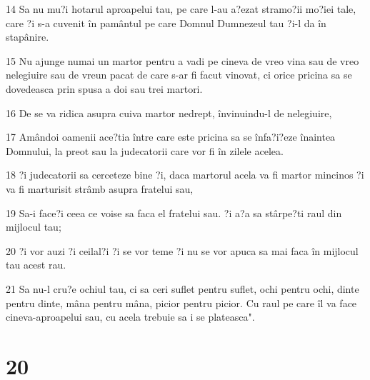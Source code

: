 \par 14 Sa nu mu?i hotarul aproapelui tau, pe care l-au a?ezat stramo?ii mo?iei tale, care ?i s-a cuvenit în pamântul pe care Domnul Dumnezeul tau ?i-l da în stapânire.
\par 15 Nu ajunge numai un martor pentru a vadi pe cineva de vreo vina sau de vreo nelegiuire sau de vreun pacat de care s-ar fi facut vinovat, ci orice pricina sa se dovedeasca prin spusa a doi sau trei martori.
\par 16 De se va ridica asupra cuiva martor nedrept, învinuindu-l de nelegiuire,
\par 17 Amândoi oamenii ace?tia între care este pricina sa se înfa?i?eze înaintea Domnului, la preot sau la judecatorii care vor fi în zilele acelea.
\par 18 ?i judecatorii sa cerceteze bine ?i, daca martorul acela va fi martor mincinos ?i va fi marturisit strâmb asupra fratelui sau,
\par 19 Sa-i face?i ceea ce voise sa faca el fratelui sau. ?i a?a sa stârpe?ti raul din mijlocul tau;
\par 20 ?i vor auzi ?i ceilal?i ?i se vor teme ?i nu se vor apuca sa mai faca în mijlocul tau acest rau.
\par 21 Sa nu-l cru?e ochiul tau, ci sa ceri suflet pentru suflet, ochi pentru ochi, dinte pentru dinte, mâna pentru mâna, picior pentru picior. Cu raul pe care îl va face cineva-aproapelui sau, cu acela trebuie sa i se plateasca".

\chapter{20}

